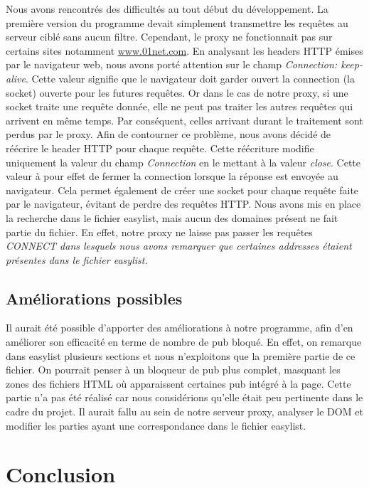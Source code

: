 \documentclass[a4paper,11pt, oneside]{book}
\begin{document}
			\noindent Nous avons rencontrés des difficultés au tout début du développement.
			La première version du programme devait simplement transmettre les requêtes au serveur ciblé sans aucun filtre.
			Cependant, le proxy ne fonctionnait pas sur certains sites notamment \href{http://www.01net.com}{www.01net.com}.
			En analysant les headers HTTP émises par le navigateur web, nous avons porté attention sur le champ
			\textit{Connection: keep-alive}. Cette valeur signifie que le navigateur doit garder ouvert la connection (la socket) ouverte
			pour les futures requêtes. Or dans le cas de notre proxy, si une socket traite une requête donnée, elle ne peut
			pas traiter les autres requêtes qui arrivent en même temps. Par conséquent, celles arrivant durant le traitement sont perdus par
			le proxy. Afin de contourner ce problème,
			nous avons décidé de réécrire le header HTTP pour chaque requête. Cette réécriture
			modifie uniquement la valeur du champ \textit{Connection} en le mettant à la valeur \textit{close}.
			Cette valeur à pour effet de fermer la connection lorsque la réponse est envoyée au navigateur. Cela permet
			également de créer une socket pour chaque requête faite par le navigateur, évitant de perdre des requêtes HTTP.
			Nous avons mis en place la recherche dans le fichier easylist, mais aucun des domaines présent ne fait partie du fichier.
			En effet, notre proxy ne laisse pas passer les requêtes \it{CONNECT} dans lesquels nous avons remarquer que certaines addresses étaient
			présentes dans le fichier easylist.

		\section{Améliorations possibles}

			Il aurait été possible d'apporter des améliorations à notre programme, afin d'en améliorer son efficacité en terme
			de nombre de pub bloqué. En effet, on remarque dans easylist plusieurs sections et nous n'exploitons que la première partie
			de ce fichier. On pourrait penser à un bloqueur de pub plus complet, masquant les zones des fichiers HTML où apparaissent certaines
			pub intégré à la page. Cette partie n'a pas été réalisé car nous considérions qu'elle était peu pertinente dans le cadre du projet.
			Il aurait fallu au sein de notre serveur proxy, analyser le DOM et modifier les parties ayant une correspondance dans le fichier
			easylist.

			\chapter{Conclusion}
\end{document}
